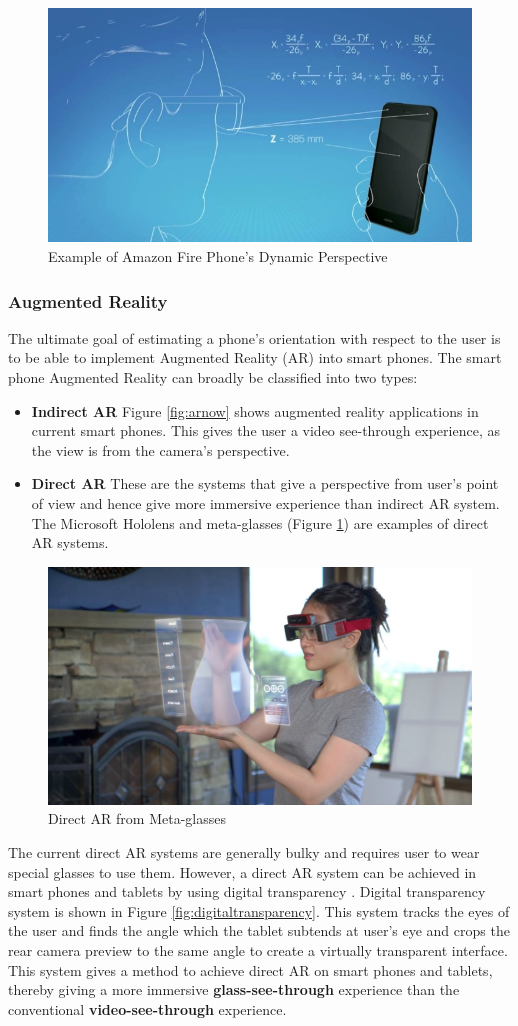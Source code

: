 \documentclass[12pt,twocolumn,letterpaper]{article}
\begin{document}
\begin{figure}[!htbp]
\centering
\includegraphics[height=35 mm]{images/dp.jpg}
\caption{Example of Amazon Fire Phone's Dynamic Perspective}
\end{figure}

\subsubsection{Augmented Reality}

The ultimate goal of estimating a phone's orientation with respect to the user is to be able to implement Augmented Reality (AR) into smart phones. The smart phone Augmented Reality can broadly be classified into two types:
\begin{itemize}
\item \textbf{Indirect AR} Figure \ref{fig:arnow} shows augmented reality applications in current smart phones. This gives the user a video see-through experience, as the view is from the camera's perspective.
\item \textbf{Direct AR} These are the systems that give a perspective from user's point of view and hence give more immersive experience than indirect AR system. The Microsoft Hololens and meta-glasses (Figure \ref{fig:directar}) are examples of direct AR systems. 
\end{itemize}


\begin{figure}[!htbp]
\centering
\includegraphics[height=30 mm]{images/mata}
\caption{Direct AR from Meta-glasses}
\label{fig:directar}
\end{figure}

The current direct AR systems are generally bulky and requires user to wear special glasses to use them. However, a direct AR system can be achieved in smart phones and tablets by using digital transparency \cite{jai}. Digital transparency system is shown in Figure \ref{fig:digitaltransparency}. This system tracks the eyes of the user and finds the angle which the tablet subtends at user's eye and crops the rear camera preview to the same angle to create a virtually transparent interface. This system gives a method to achieve direct AR on smart phones and tablets, thereby giving a more immersive \textbf{glass-see-through} experience than the conventional \textbf{video-see-through} experience.
\end{document}
